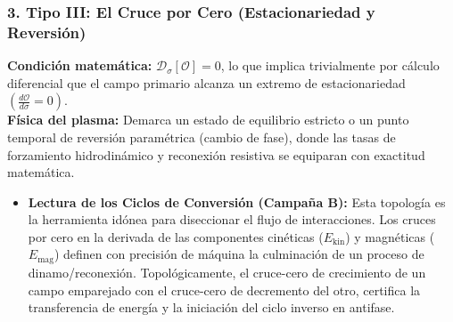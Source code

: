 \subsubsection*{3. Tipo III: El Cruce por Cero (Estacionariedad y Reversión)}
\textbf{Condición matemática:} $\mathcal{D}_\sigma[\mathcal{O}] = 0$, lo que implica trivialmente por cálculo diferencial que el campo primario alcanza un extremo de estacionariedad $\left(\frac{d\mathcal{O}}{d\sigma} = 0\right)$.\\
\textbf{Física del plasma:} Demarca un estado de equilibrio estricto o un punto temporal de reversión paramétrica (cambio de fase), donde las tasas de forzamiento hidrodinámico y reconexión resistiva se equiparan con exactitud matemática.
\begin{itemize}
    \item \textbf{Lectura de los Ciclos de Conversión (Campaña B):} Esta topología es la herramienta idónea para diseccionar el flujo de interacciones. Los cruces por cero en la derivada de las componentes cinéticas ($E_{\text{kin}}$) y magnéticas ($E_{\text{mag}}$) definen con precisión de máquina la culminación de un proceso de dinamo/reconexión. Topológicamente, el cruce-cero de crecimiento de un campo emparejado con el cruce-cero de decremento del otro, certifica la transferencia de energía y la iniciación del ciclo inverso en antifase.
\end{itemize}